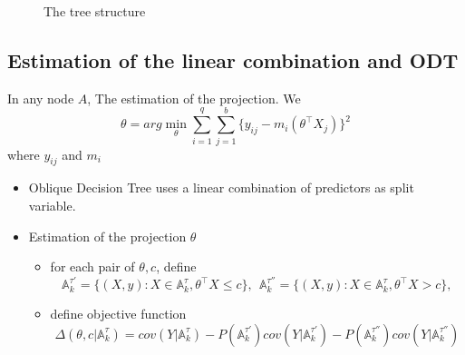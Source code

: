\documentclass[nojss]{jss}
\numberwithin{equation}{section}
\begin{document}
\begin{figure}[t!]
\caption{\label{fig:subtree} The tree structure}
\end{figure}

\subsection{Estimation of the linear combination and ODT}
In any node $ A $,  The estimation of the projection. We
$$
 \theta = arg \min_\theta \sum_{i=1}^q \sum_{j=1}^b \{y_{ij} - m_i(\theta^\top X_j)\}^2
$$
where $ y_{ij} $ and $ m_i $

\begin{itemize}
  \item Oblique Decision Tree uses a linear combination of predictors as split variable.

  \item Estimation of the projection $ \theta $

  \begin{itemize}

  \item for each pair of $ \theta,c $, define
  $$
    \mathbb{A}_k^{\tau'} = \{ (X, y): X \in \mathbb{A}_k^\tau, \theta^\top X \le c\}, \ \
    \mathbb{A}_k^{\tau''} = \{ (X, y): X \in \mathbb{A}_k^\tau, \theta^\top X > c\},
  $$

  \item define objective function
  $$
  \Delta(\theta,c| \mathbb{A}_k^\tau)= cov(Y|\mathbb{A}_k^\tau) - P(\mathbb{A}_k^{\tau'})cov(Y|\mathbb{A}_k^{\tau'}) - P(\mathbb{A}_k^{\tau''})cov(Y|\mathbb{A}_k^{\tau''})
   $$


\end{itemize}





\end{itemize}
\end{document}
